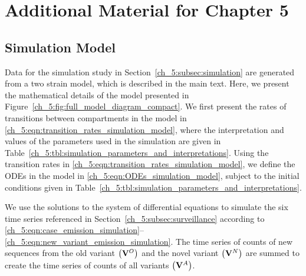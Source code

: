 \chapter{Additional Material for Chapter 5}
\graphicspath{{figures/ch_5/}}

\section{Simulation Model}
\label{ch_5:sec:full_simulation_model_explanation}

Data for the simulation study in Section~\ref{ch_5:subsec:simulation} are generated from a two strain model, which is described in the main text.
Here, we present the mathematical details of the model presented in Figure~\ref{ch_5:fig:full_model_diagram_compact}.
We first present the rates of transitions between compartments in the model in \eqref{ch_5:eqn:transition_rates_simulation_model}, where the interpretation and values of the parameters used in the simulation are given in Table~\ref{ch_5:tbl:simulation_parameters_and_interpretations}.
Using the transition rates in \eqref{ch_5:eqn:transition_rates_simulation_model}, we define the ODEs in the model in \eqref{ch_5:eqn:ODEs_simulation_model}, subject to the initial conditions given in Table~\ref{ch_5:tbl:simulation_parameters_and_interpretations}.

We use the solutions to the system of differential equations to simulate the six time series referenced in Section~\ref{ch_5:subsec:surveillance}  according to \eqref{ch_5:eqn:case_emission_simulation}--\eqref{ch_5:eqn:new_variant_emission_simulation}.
The time series of counts of new sequences from the old variant \( \left( \mathbf{V}^O \right) \) and the novel variant \( \left( \mathbf{V}^N \right) \) are summed to create the time series of counts of all variants \( \left( \mathbf{V}^A \right) \).

